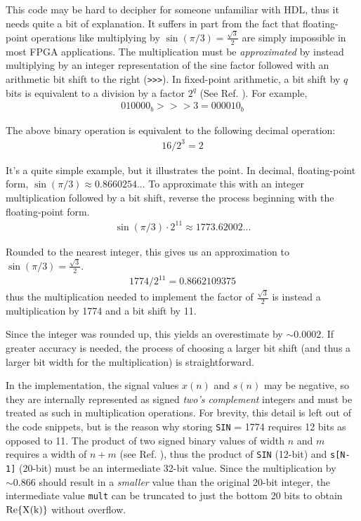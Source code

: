 \documentclass[reprint,amsmath,amssymb,aps,pra]{revtex4-2}
\begin{document}
This code may be hard to decipher for someone unfamiliar with HDL, thus it needs quite a bit of explanation. It suffers in part from the fact that floating-point operations like multiplying by $\sin(\pi / 3) = \frac{\sqrt{3}}{2}$ are simply impossible in most FPGA applications. The multiplication must be \textit{approximated} by instead multiplying by an integer representation of the sine factor followed with an arithmetic bit shift to the right (\verb|>>>|). In fixed-point arithmetic, a bit shift by $q$ bits is equivalent to a division by a factor $2^q$ (See Ref. \cite{fixed-point}). For example,
\begin{align*}
    010000_b >>> 3 = 000010_b
\end{align*}

The above binary operation is equivalent to the following decimal operation:
\begin{align*}
    16 / 2^{3} = 2
\end{align*}

It's a quite simple example, but it illustrates the point. In decimal, floating-point form, $\sin(\pi/3) \approx 0.8660254...$ To approximate this with an integer multiplication followed by a bit shift, reverse the process beginning with the floating-point form.
\begin{align*}
    \sin(\pi/3) \cdot 2^{11} \approx 1773.62002...
\end{align*}

Rounded to the nearest integer, this gives us an approximation to $\sin(\pi / 3) = \frac{\sqrt{3}}{2}$.
\begin{align}
    1774 / 2^{11} = 0.8662109375
\end{align}
thus the multiplication needed to implement the factor of $\frac{\sqrt{3}}{2}$ is instead a multiplication by 1774 and a bit shift by 11.

Since the integer was rounded up, this yields an overestimate by $\sim 0.0002$. If greater accuracy is needed, the process of choosing a larger bit shift (and thus a larger bit width for the multiplication) is straightforward. 

In the implementation, the signal values $x(n)$ and $s(n)$ may be negative, so they are internally represented as signed \textit{two's complement} integers and must be treated as such in multiplication operations. For brevity, this detail is left out of the code snippets, but is the reason why storing \verb|SIN| = 1774 requires 12 bits as opposed to 11. The product of two signed binary values of width $n$ and $m$ requires a width of $n+m$ (see Ref. \cite{fixed-point}), thus the product of \verb|SIN| (12-bit) and \verb|s[N-1]| (20-bit) must be an intermediate 32-bit value. Since the multiplication by $\sim 0.866$ should result in a \textit{smaller} value than the original 20-bit integer, the intermediate value \verb|mult| can be truncated to just the bottom 20 bits to obtain $\rm{Re}\{X(k)\}$ without overflow. 
\end{document}
